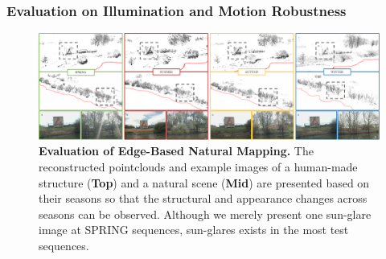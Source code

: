 \subsubsection{Evaluation on Illumination and Motion Robustness }

\begin{figure} 
  	\centering
  	\includegraphics[width=\linewidth]{figures/illumination/edge_reconstruction.pdf}
    \caption[Evaluation of Edge-Based Natural Mapping]{ \textbf{Evaluation of Edge-Based Natural Mapping.} The reconstructed pointclouds and example images of a human-made structure (\textbf{Top}) and a natural scene (\textbf{Mid}) are presented based on their seasons so that the structural and appearance changes across seasons can be observed. Although we merely present one sun-glare image at SPRING sequences, sun-glares exists in the most test sequences. 
	\label{fig:edge_reconstruction}}
\end{figure}


